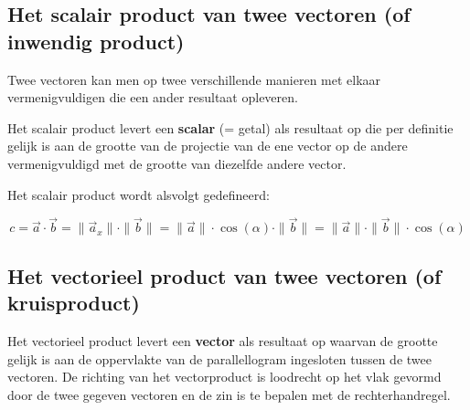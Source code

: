 \documentclass{ximera}
\begin{document}
\subsection*{Het scalair product van twee vectoren (of inwendig product)}

Twee vectoren kan men op twee verschillende manieren met elkaar vermenigvuldigen die een ander resultaat opleveren. 

Het scalair product levert een \textbf{scalar} (= getal) als resultaat op die per definitie gelijk is aan de grootte van de projectie van de ene vector op de andere vermenigvuldigd met de grootte van diezelfde andere vector. 

Het scalair product wordt alsvolgt gedefineerd: 

\[
c = \vec{a} \cdot \vec{b} = \| \vec{a}_x \| \cdot \|\vec{b}\| = \|\vec{a}\| \cdot \cos(\alpha) \cdot \|\vec{b}\| = \| \vec{a}\| \cdot \| \vec{b}\| \cdot \cos(\alpha)
\]

\begin{image}
\end{image}

\subsection*{Het vectorieel product van twee vectoren (of kruisproduct)}

Het vectorieel product levert een \textbf{vector} als resultaat op waarvan de grootte gelijk is aan de oppervlakte van de parallellogram ingesloten tussen de twee vectoren. 
De richting van het vectorproduct is loodrecht op het vlak gevormd door de twee gegeven vectoren en de zin is te bepalen met de rechterhandregel.
\end{document}
